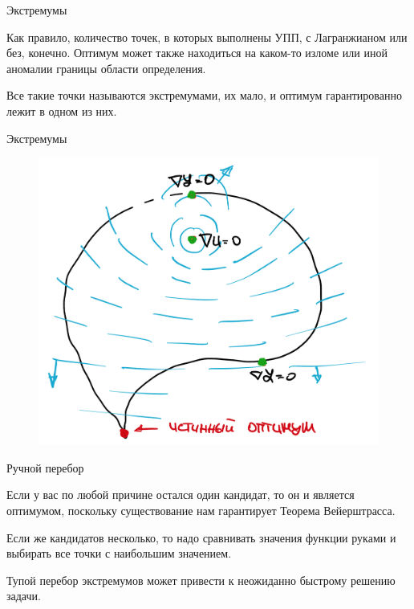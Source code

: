 \documentclass{beamer}
\begin{document}
\begin{frame}{Экстремумы}

Как правило, количество точек, в которых выполнены УПП, с Лагранжианом или без,  конечно. Оптимум может также находиться на каком-то изломе или иной аномалии границы области определения.

Все такие точки называются \alert{экстремумами}, их мало, и оптимум гарантированно лежит в одном из них. 

\end{frame}

\begin{frame}{Экстремумы}

\begin{figure}[hbt]
\centering
\includegraphics[width=.8 \textwidth]{extrema.png}
\end{figure}

\end{frame}

\begin{frame}{Ручной перебор}

Если у вас по любой причине остался один кандидат, то он и является оптимумом, поскольку существование нам гарантирует Теорема Вейерштрасса. 

Если же кандидатов несколько, то надо сравнивать значения функции руками и выбирать все точки с наибольшим значением. 

Тупой перебор экстремумов может привести к неожиданно быстрому решению задачи.

\end{frame}
\end{document}
